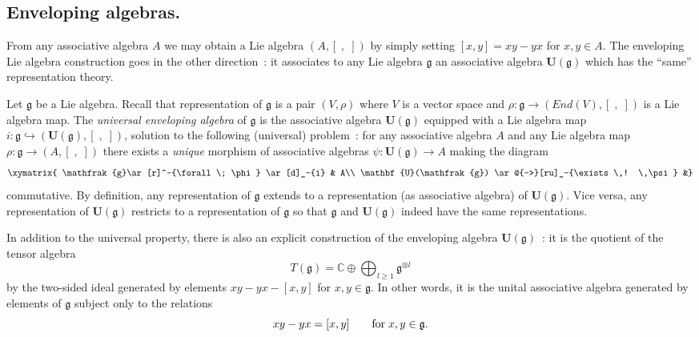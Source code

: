 \documentclass[a4paper,10pt]{amsart}
\def\U{\mathbf{U}}
\def\C{\mathbb{C}}
\def\g{\mathfrak{g}}
\numberwithin{equation}{section}
\begin{document}
{\vspace{.2in}

\subsection{Enveloping algebras.}

\vspace{.15in}

From any associative algebra $A$ we may obtain a Lie algebra $(A,[\;,\;])$ by simply setting $[x,y]=xy-yx$ for $x, y \in A$. The enveloping Lie algebra construction goes in the other direction~: it associates to any Lie algebra $\g$ an associative algebra $\U(\g)$ which has the ``same'' representation theory.

Let $\g$ be a Lie algebra. Recall that  representation of $\g$ is a pair $(V,\rho)$ where $V$ is a vector space and $\rho: \g \to ({End}(V), [\;,\;])$ is a Lie algebra map. The \textit{universal enveloping algebra} of $\g$ is the associative algebra $\U(\g)$ equipped with a Lie algebra map $i:\g \hookrightarrow (\U(\g),[\;,\;])$, solution to the following (universal) problem~: for any associative algebra $A$ and any Lie algebra map $\rho: \g \to (A,[\;,\;])$ there exists a \textit{unique}
morphism of associative algebras $ \psi: \U(\g) \to A$ making the diagram
$$\xymatrix{
\g \ar[r]^-{\forall\; \phi} \ar[d]_-{i} & A\\
\U(\g) \ar@{-->}[ru]_-{\exists \,! \,\psi} &}$$
commutative. By definition, any representation of $\g$ extends to a representation (as associative algebra) of $\U(\g)$. Vice versa, any representation of $\U(\g)$ restricts to a representation of $\g$ so that $\g$ and $\U(\g)$ indeed have the same representations.

\vspace{.15in}

In addition to the universal property, there is also an explicit construction of the enveloping algebra $\U(\g)$~: it is the quotient of the tensor algebra
$$T(\g) =\C \oplus \bigoplus_{l \geq 1} \g ^{\otimes l}$$
by the two-sided ideal generated by elements $xy-yx-[x,y]$ for $x,y \in \g$. In other words, it is the
unital associative algebra generated by elements of $\g$ subject only to the relations
\begin{equation}\label{E:univenvelop}
xy-yx=[x,y]\qquad \text{for\;} x,y \in \g.
\end{equation}

}
\end{document}
